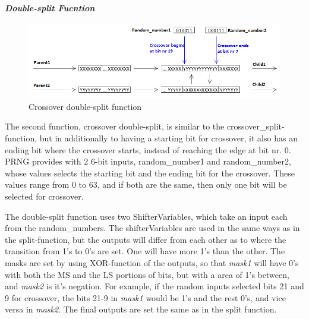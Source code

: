 
\paragraph{\textit{Double-split Fucntion}}
\begin{figure}[H]
\includegraphics[width=\textwidth]{fpga/fig/crossover_doublesplit.png}
\caption{Crossover double-split function}
\label{fig_crossover_doublesplit}
\end{figure}

The second function, crossover double-split, is similar to the crossover\_split-function, but in additionally to having a starting bit for crossover, it also has an ending bit where the crossover starts, instead of reaching the edge at bit nr. 0. PRNG provides with 2 6-bit inputs, random\_number1 and random\_number2, whose values selects the starting bit and the ending bit for the crossover. These values range from 0 to 63, and if both are the same, then only one bit will be selected for crossover.

The double-split function uses two ShifterVariables, which take an input each from the random\_numbers. The shifterVariables are used in the same ways as in the split-function, but the outputs will differ from each other as to where the transition from 1's to 0's are set. One will have more 1's than the other. The masks are set by using XOR-function of the outputs, so that \emph{mask1} will have 0's with both the MS and the LS portions of bits, but with a area of 1's between, and \emph{mask2} is it's negation. For example, if the random inputs selected bits 21 and 9 for crossover, the bits 21-9 in \emph{mask1} would be 1's and the rest 0's, and vice versa in \emph{mask2}. The final outputs are set the same as in the split function. 

